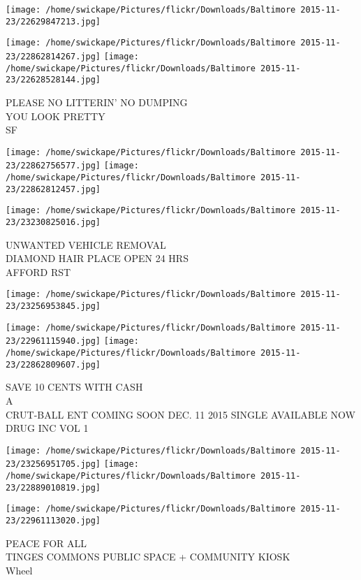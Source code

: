 \documentclass[10pt,letterpaper]{article}
\begin{document}
\texttt{[image: /home/swickape/Pictures/flickr/Downloads/Baltimore 2015-11-23/22629847213.jpg]}

\vspace{0.25in}
\texttt{[image: /home/swickape/Pictures/flickr/Downloads/Baltimore 2015-11-23/22862814267.jpg]}
\texttt{[image: /home/swickape/Pictures/flickr/Downloads/Baltimore 2015-11-23/22628528144.jpg]}

PLEASE NO LITTERIN' NO DUMPING\\
YOU LOOK PRETTY\\
SF
\pagebreak

\texttt{[image: /home/swickape/Pictures/flickr/Downloads/Baltimore 2015-11-23/22862756577.jpg]}
\texttt{[image: /home/swickape/Pictures/flickr/Downloads/Baltimore 2015-11-23/22862812457.jpg]}

\vspace{0.25in}
\texttt{[image: /home/swickape/Pictures/flickr/Downloads/Baltimore 2015-11-23/23230825016.jpg]}

UNWANTED VEHICLE REMOVAL\\
DIAMOND HAIR PLACE OPEN 24 HRS\\
AFFORD RST
\pagebreak

\texttt{[image: /home/swickape/Pictures/flickr/Downloads/Baltimore 2015-11-23/23256953845.jpg]}

\vspace{0.25in}
\texttt{[image: /home/swickape/Pictures/flickr/Downloads/Baltimore 2015-11-23/22961115940.jpg]}
\texttt{[image: /home/swickape/Pictures/flickr/Downloads/Baltimore 2015-11-23/22862809607.jpg]}

SAVE 10 CENTS WITH CASH\\
A\\
CRUT{-}BALL ENT COMING SOON DEC. 11 2015 SINGLE AVAILABLE NOW DRUG INC VOL 1
\pagebreak

\texttt{[image: /home/swickape/Pictures/flickr/Downloads/Baltimore 2015-11-23/23256951705.jpg]}
\texttt{[image: /home/swickape/Pictures/flickr/Downloads/Baltimore 2015-11-23/22889010819.jpg]}

\vspace{0.25in}
\texttt{[image: /home/swickape/Pictures/flickr/Downloads/Baltimore 2015-11-23/22961113020.jpg]}

PEACE FOR ALL\\
TINGES COMMONS PUBLIC SPACE + COMMUNITY KIOSK\\
Wheel
\pagebreak
\end{document}
